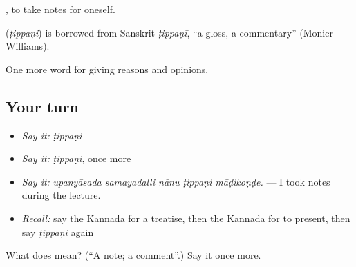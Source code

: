  , to take notes for oneself.

\begin{cousinweb}
\textbf{} (\emph{ṭippaṇi}) is borrowed from Sanskrit \emph{ṭippaṇī}, \textquotedblleft{}a gloss, a commentary\textquotedblright{} (Monier-Williams).
\end{cousinweb}

\begin{grammarlens}[title={What you've built}]
One more word for giving reasons and opinions.
\end{grammarlens}

\subsection*{Your turn}
\begin{itemize}
\raggedright
  \item \emph{Say it:} \emph{ṭippaṇi}
  \item \emph{Say it:} \emph{ṭippaṇi}, once more
  \item \emph{Say it:} \emph{upanyāsada samayadalli nānu ṭippaṇi māḍikoṇḍe.} — I took notes during the lecture.
  \item \emph{Recall:} say the Kannada for a treatise, then the Kannada for to present, then say \emph{ṭippaṇi} again
\end{itemize}

\begin{tcolorbox}[breakable,colback=teal!4,colframe=teal!35!black,title={Before you move on}]
What does  mean? (\textquotedblleft{}A note; a comment\textquotedblright{}.) Say it once more.
\end{tcolorbox}
